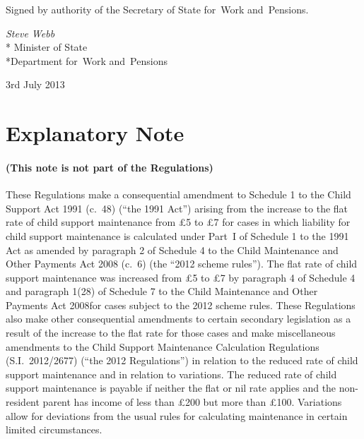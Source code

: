 \documentclass[12pt,a4paper]{article}
\begin{document}
Signed 
by authority of the 
Secretary of State for~Work and~Pensions.

{\raggedleft
\emph{Steve Webb}\\*
Minister
of State\\*Department 
for~Work and~Pensions

}

3rd July 2013

\small

\part{Explanatory Note}

\renewcommand\parthead{— Explanatory Note}

\subsection*{(This note is not part of the Regulations)}

These Regulations make a consequential amendment to Schedule 1 to the Child Support Act 1991 (c.~48) (“the 1991 Act”) arising from the increase to the flat rate of child support maintenance from £5 to £7 for cases in which liability for child support maintenance is calculated under Part~I of Schedule 1 to the 1991 Act as amended by paragraph 2 of Schedule 4 to the Child Maintenance and Other Payments Act 2008 (c.~6) (the “2012 scheme rules”). The flat rate of child support maintenance was increased from £5 to £7 by paragraph 4 of Schedule 4 and paragraph 1(28) of Schedule 7 to the Child Maintenance and Other Payments Act 2008for cases subject to the 2012 scheme rules. These Regulations also make other consequential amendments to certain secondary legislation as a result of the increase to the flat rate for those cases and make miscellaneous amendments to the Child Support Maintenance Calculation Regulations (S.I.~2012/2677) (“the 2012 Regulations”) in relation to the reduced rate of child support maintenance and in relation to variations. The reduced rate of child support maintenance is payable if neither the flat or nil rate applies and the non-resident parent has income of less than £200 but more than £100. Variations allow for deviations from the usual rules for calculating maintenance in certain limited circumstances.
\end{document}
